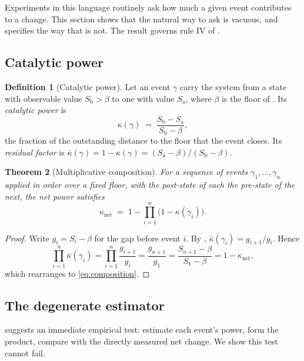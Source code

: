 \documentclass[11pt,twocolumn,a4paper]{article}
\theoremstyle{thmstyle}
\newtheorem{theorem}{Theorem}[section]
\theoremstyle{definition}
\newtheorem{definition}[theorem]{Definition}
\theoremstyle{remark}
\newcommand{\flo}{\beta}
\newcommand{\kap}{\kappa}
\begin{document}
Experiments in this language routinely ask how much a given event contributes
to a change. This section shows that the natural way to ask is vacuous, and
specifies the way that is not. The result governs rule IV of
.

\subsection{Catalytic power}

\begin{definition}[Catalytic power]
\label{def:power}
Let an event $\gamma$ carry the system from a state with observable value
$S_{\mathrm{b}}>\flo$ to one with value $S_{\mathrm{a}}$, where $\flo$ is the
floor of . Its \emph{catalytic power} is
\begin{equation}
\kap(\gamma)\;=\;\frac{S_{\mathrm{b}}-S_{\mathrm{a}}}{S_{\mathrm{b}}-\flo},
\label{eq:kappa}
\end{equation}
the fraction of the outstanding distance to the floor that the event closes.
Its \emph{residual factor} is
$\bar\kap(\gamma)=1-\kap(\gamma)
=(S_{\mathrm{a}}-\flo)/(S_{\mathrm{b}}-\flo)$.
\end{definition}

\begin{theorem}[Multiplicative composition]
\label{thm:composition}
For a sequence of events $\gamma_1,\dots,\gamma_n$ applied in order over a
fixed floor, with the post-state of each the pre-state of the next, the net
power satisfies
\begin{equation}
\kap_{\mathrm{net}}
\;=\;1-\prod_{i=1}^{n}\bigl(1-\kap(\gamma_i)\bigr).
\label{eq:composition}
\end{equation}
\end{theorem}

\begin{proof}
Write $g_i=S_i-\flo$ for the gap before event $i$. By
, $\bar\kap(\gamma_i)=g_{i+1}/g_i$. Hence
\[
\prod_{i=1}^{n}\bar\kap(\gamma_i)=\prod_{i=1}^{n}\frac{g_{i+1}}{g_i}
=\frac{g_{n+1}}{g_1}=\frac{S_{n+1}-\flo}{S_1-\flo}=1-\kap_{\mathrm{net}},
\]
which rearranges to \eqref{eq:composition}.
\end{proof}

\subsection{The degenerate estimator}

 suggests an immediate empirical test: estimate each
event's power, form the product, compare with the directly measured net
change. We show this test cannot fail.
\end{document}
